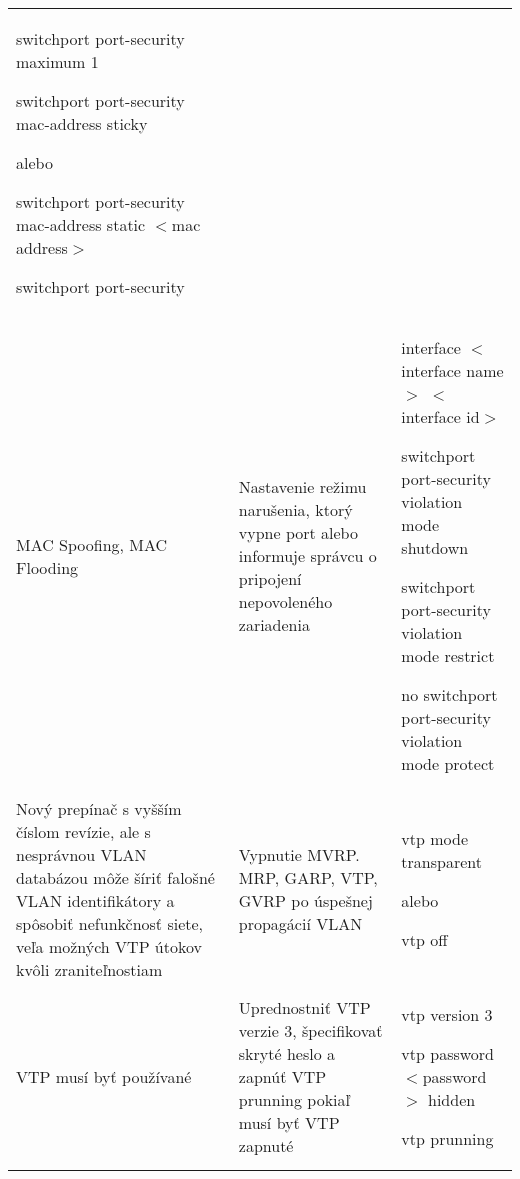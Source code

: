 \begin{longtable}[!htbp]{|L{10em}L{10em}>{\selectfont}L{34em}|}
	\hspace{0.5em}switchport port-security maximum 1
	
	\hspace{0.5em}switchport port-security mac-address sticky
	
	\vspace{0.5em}
	{\selectfont alebo}
	\vspace{0.5em}
	
	\hspace{0.5em}switchport port-security mac-address static $<$mac address$>$
	
	\hspace{0.5em}switchport port-security\\
	
	
	
	 MAC Spoofing, MAC Flooding 	&Nastavenie režimu narušenia, ktorý vypne port alebo informuje správcu o pripojení nepovoleného zariadenia	&interface $<$interface name$>$ $<$interface id$>$
	
	\hspace{0.5em}switchport port-security violation mode shutdown
	
	\hspace{0.5em}switchport port-security violation mode restrict
	
	\hspace{0.5em}no switchport port-security violation mode protect\\
	
	
	
	
	Nový prepínač s vyšším číslom revízie, ale s nesprávnou VLAN databázou môže šíriť falošné VLAN identifikátory a spôsobiť nefunkčnosť siete, veľa možných VTP útokov kvôli zraniteľnostiam 	&Vypnutie MVRP. MRP, GARP, VTP, GVRP po úspešnej propagácií VLAN	&vtp mode transparent
	
	\vspace{0.5em}
	{\selectfont alebo}
	\vspace{0.5em}
	
	vtp off\\
	
	
	
	
	VTP musí byť používané	&Uprednostniť VTP verzie 3, špecifikovať skryté heslo a zapnúť VTP prunning pokiaľ musí byť VTP zapnuté	&vtp version 3
	
	vtp password $<$password$>$ hidden
	
	vtp prunning\\
	

\end{longtable}
